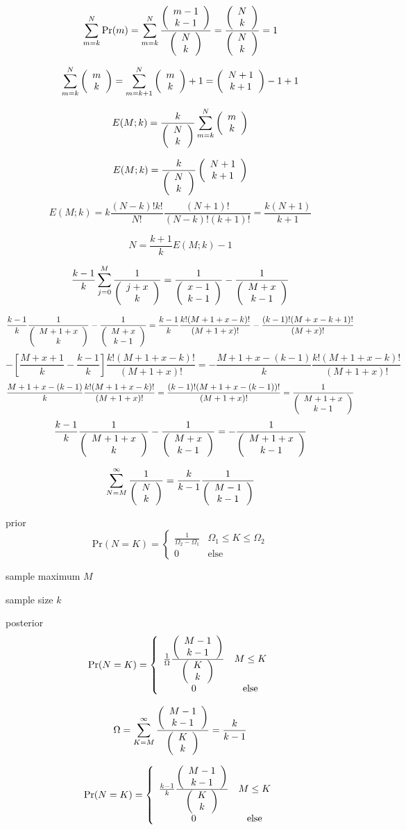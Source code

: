 \documentclass[10pt,a4paper]{article}
\begin{document}
\[
\sum_{m = k}^N \mathrm{Pr}(m) = \sum_{m = k}^N \frac{\left( \begin{array}{c} m-1 \\ k-1 \end{array} \right)}{\left( \begin{array}{c} N \\ k \end{array} \right)}  = \frac{\left( \begin{array}{c} N \\ k \end{array} \right)}{\left( \begin{array}{c} N \\ k \end{array} \right)} = 1\\
\]

\[
\sum_{m = k}^N \left( \begin{array}{c} m \\ k \end{array} \right) = \sum_{m = k+1}^N \left( \begin{array}{c} m \\ k \end{array} \right) + 1 = \left( \begin{array}{c} N+1 \\ k+1 \end{array} \right) - 1 + 1
\]


\[
E(M;k)  = \frac{k}{\left( \begin{array}{c} N \\ k \end{array} \right)} \sum_{m = k}^N \left( \begin{array}{c} m \\ k \end{array} \right)
\]

\[
E(M;k)  = \frac{k}{\left( \begin{array}{c} N \\ k \end{array} \right)}\left( \begin{array}{c} N+1 \\ k+1 \end{array} \right)
\]
\[
E(M;k)  = k \frac{(N-k)!k!}{N!}\frac{(N+1)!}{(N-k)!(k+1)!} = \frac{k(N+1)}{k+1}
\]

\[
N = \frac{k+1}{k}E(M;k)  - 1
\]


\[
\frac{k-1}{k}\sum_{j=0}^M \frac{1}{\left( \begin{array}{c} j+x \\ k \end{array} \right)} = \frac{1}{\left( \begin{array}{c} x-1 \\ k-1 \end{array} \right)} - \frac{1}{\left( \begin{array}{c} M+x \\ k-1 \end{array} \right)}
\]

\[
\frac{k-1}{k}\frac{1}{\left( \begin{array}{c} M+1+x \\ k \end{array} \right)} - \frac{1}{\left( \begin{array}{c} M+x \\ k-1 \end{array} \right)} = \frac{k-1}{k}\frac{k!(M+1+x-k)!}{(M+1+x)!} - \frac{(k-1)!(M+x-k+1)!}{(M+x)!}
\]
\[
-\left[\frac{M+x+1}{k}-\frac{k-1}{k}\right]\frac{k!(M+1+x-k)!}{(M+1+x)!}=-\frac{M+1+x-(k-1)}{k}\frac{k!(M+1+x-k)!}{(M+1+x)!}
\]
\[
\frac{M+1+x-(k-1)}{k}\frac{k!(M+1+x-k)!}{(M+1+x)!} = \frac{(k-1)!(M+1+x-(k-1))!}{(M+1+x)!}=\frac{1}{\left( \begin{array}{c} M+1+x \\ k-1 \end{array} \right)}
\]
\[
\frac{k-1}{k}\frac{1}{\left( \begin{array}{c} M+1+x \\ k \end{array} \right)} - \frac{1}{\left( \begin{array}{c} M+x \\ k-1 \end{array} \right)} = -\frac{1}{\left( \begin{array}{c} M+1+x \\ k-1 \end{array} \right)}
\]

\[
\sum_{N = M}^{\infty} \frac{1}{\left( \begin{array}{c} N \\ k \end{array} \right)} = \frac{k}{k-1}\frac{1}{\left( \begin{array}{c} M-1 \\ k-1 \end{array} \right)}
\]


prior
\[
\mathrm{Pr}(N = K) = \left\{ \begin{array}{lc}
\frac{1}{\Omega_2-\Omega_1} & \Omega_1 \leq K \leq \Omega_2 \\
0 & \mathrm{else} 
\end{array}\right.
\]

sample maximum $M$

sample size $k$

posterior
\[
\mathrm{Pr}(N = K) = \left\{ \begin{array}{cc}
\frac{1}{\Omega}\frac{\left( \begin{array}{c} M-1 \\ k-1 \end{array} \right)}{\left( \begin{array}{c} K \\ k \end{array} \right)} & M \leq K \\
0 & \mathrm{else} 
\end{array}\right.
\]

\[
\Omega = \sum_{K = M}^{\infty} \frac{\left( \begin{array}{c} M-1 \\ k-1 \end{array} \right)}{\left( \begin{array}{c} K \\ k \end{array} \right)} = \frac{k}{k-1}
\]

\[
\mathrm{Pr}(N = K) = \left\{ \begin{array}{cc}
\frac{k-1}{k}\frac{\left( \begin{array}{c} M-1 \\ k-1 \end{array} \right)}{\left( \begin{array}{c} K \\ k \end{array} \right)} & M \leq K \\
0 & \mathrm{else} 
\end{array}\right.
\]
\end{document}
